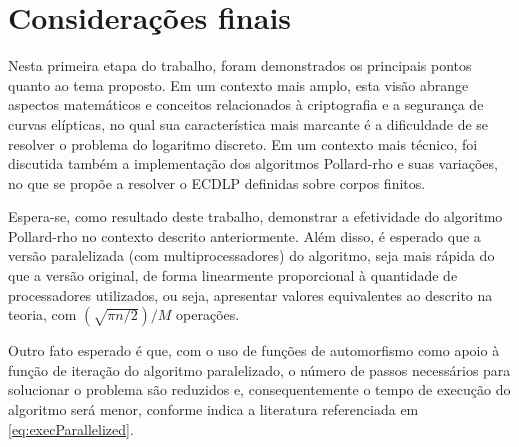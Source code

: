 \chapter{Considerações finais}
Nesta primeira etapa do trabalho, foram demonstrados os principais pontos quanto ao tema proposto. Em um contexto mais amplo, esta visão abrange aspectos matemáticos e conceitos relacionados à criptografia e a segurança de curvas elípticas, no qual sua característica mais marcante é a dificuldade de se resolver o problema do logaritmo discreto. Em um contexto mais técnico, foi discutida também a implementação dos algoritmos Pollard-rho e suas variações, no que se propõe a resolver o ECDLP definidas sobre corpos finitos.

Espera-se, como resultado deste trabalho, demonstrar a efetividade do algoritmo Pollard-rho no contexto descrito anteriormente. Além disso, é esperado que a versão paralelizada (com multiprocessadores) do algoritmo, seja mais rápida do que a versão original, de forma linearmente proporcional à quantidade de processadores utilizados, ou seja, apresentar valores equivalentes ao descrito na teoria, com $(\sqrt{\pi n/2})/M$ operações.

Outro fato esperado é que, com o uso de funções de automorfismo como apoio à função de iteração do algoritmo paralelizado, o número de passos necessários para solucionar o problema são reduzidos e, consequentemente o tempo de execução do algoritmo será menor, conforme indica a literatura referenciada em \ref{eq:execParallelized}.
